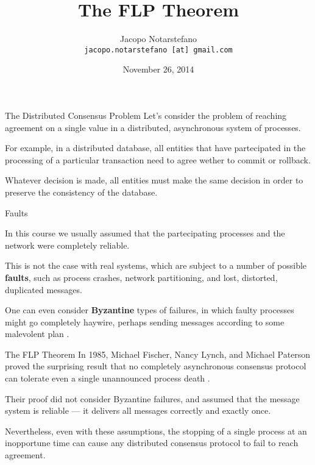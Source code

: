 \documentclass[12pt]{beamer}
\title{The FLP Theorem}
\author[Jacopo Notarstefano]{
  Jacopo Notarstefano\\
  \texttt{jacopo.notarstefano [at] gmail.com}
}
\date{November 26, 2014}
\begin{document}
  \begin{frame}[plain]
    \titlepage
  \end{frame}

  \begin{frame}{The Distributed Consensus Problem}
    Let's consider the problem of reaching agreement on a single value in a
    distributed, asynchronous system of processes.

    \vspace{0.25cm}

    For example, in a distributed database, all entities that have partecipated
    in the processing of a particular transaction need to agree wether to
    commit or rollback.

    \vspace{0.25cm}

    Whatever decision is made, all entities must make the same decision in
    order to preserve the consistency of the database.
  \end{frame}

  \begin{frame}{Faults}

    In this course we usually assumed that the partecipating processes and the
    network were completely reliable.

    \vspace{0.25cm}

    This is not the case with real systems, which are subject to a number of
    possible \textbf{faults}, such as process crashes, network partitioning,
    and lost, distorted, duplicated messages.

    \vspace{0.25cm}

    One can even consider \textbf{Byzantine} types of failures, in which faulty
    processes might go completely haywire, perhaps sending messages according
    to some malevolent plan \cite{LSP82}.
  \end{frame}

  \begin{frame}{The FLP Theorem}
    In 1985, Michael Fischer, Nancy Lynch, and Michael Paterson proved the
    surprising result that no completely asynchronous consensus protocol can
    tolerate even a single unannounced process death \cite{FLP85}.

    \vspace{0.25cm}

    Their proof did not consider Byzantine failures, and assumed that the
    message system is reliable — it delivers all messages correctly and exactly
    once.

    \vspace{0.25cm}

    Nevertheless, even with these assumptions, the stopping of a single process
    at an inopportune time can cause any distributed consensus protocol to fail
    to reach agreement.
  \end{frame}
\end{document}
